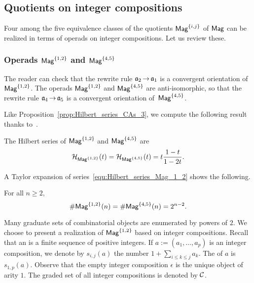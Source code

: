 \subsection{Quotients on integer compositions}
Four among the five equivalence classes of the quotients
$\mathsf{Mag}^{\{i, j\}}$ of $\mathsf{Mag}$ can be realized in terms of operads on
integer compositions. Let us review these.
\medbreak

\subsubsection{Operads $\mathsf{Mag}^{\{1, 2\}}$ and $\mathsf{Mag}^{\{4, 5\}}$}
\label{subsubsec:Mag_1_2}
The reader can check that the rewrite rule $\mathfrak{a}_2 \operatorname{\to} \mathfrak{a}_1$ is a
convergent orientation of $\mathsf{Mag}^{\{1, 2\}}$. The operads
$\mathsf{Mag}^{\{1, 2\}}$ and $\mathsf{Mag}^{\{4, 5\}}$ are anti-isomorphic, so that the
rewrite rule $\mathfrak{a}_4 \operatorname{\to} \mathfrak{a}_5$ is a convergent orientation
of~$\mathsf{Mag}^{\{4, 5\}}$.
\medbreak

Like Proposition~\ref{prop:Hilbert_series_CAs_3}, we compute the
following result thanks to~\cite{Gir18}.

\begin{Theorem} \label{thm:Hilbert_series_Mag_1_2}
    The Hilbert series of $\mathsf{Mag}^{\{1, 2\}}$ and $\mathsf{Mag}^{\{4, 5\}}$ are
    \begin{equation} \label{equ:Hilbert_series_Mag_1_2}
        \mathcal{H}_{\mathsf{Mag}^{\{1, 2\}}}(t)
        = \mathcal{H}_{\mathsf{Mag}^{\{4, 5\}}}(t) =
        t \frac{1 - t}{1 - 2t}.
    \end{equation}
\end{Theorem}
\medbreak

A Taylor expansion of series~\eqref{equ:Hilbert_series_Mag_1_2} shows
the following.

\begin{Proposition} \label{prop:Close_formula_Mag_1_2}
    For all $n \geq 2,$
    \begin{equation} \label{equ:Close_formula_Mag_1_2}
        \# \mathsf{Mag}^{\{1, 2\}}(n) = \# \mathsf{Mag}^{\{4, 5\}}(n) = 2^{n-2}.
    \end{equation}
\end{Proposition}
\medbreak

Many graduate sets of combinatorial objects are enumerated by powers of
$2$. We choose to present a realization of $\mathsf{Mag}^{\{1, 2\}}$ based on
integer compositions. Recall that an  is a
finite sequence of positive integers. If
$a := \left(a_1, \dots, a_p\right)$ is an integer composition, we denote
by $s_{i, j}(a)$ the number $1 + \sum_{i \leq k \leq j} a_k$. The
 of $a$ is $s_{1, p}(a)$. Observe that the empty integer
composition $\epsilon$ is the unique object of arity $1$. The graded set
of all integer compositions is denoted by $\mathcal{C}$.
\medbreak

